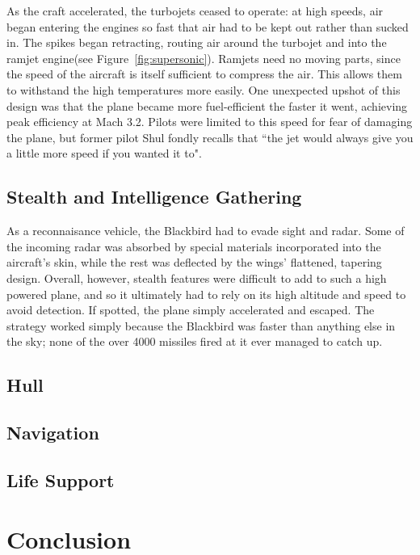 \documentclass[12pt, draftnocls, onecolumn]{IEEEtran}
\newcommand{\figref}[1]{Figure~\ref{fig:#1}}
\begin{document}
	As the craft accelerated, the turbojets ceased to operate: at high speeds, air began entering the engines so fast that air had to be kept out rather than sucked in. The spikes began retracting, routing air around the turbojet and into the ramjet engine(see \figref{supersonic}). Ramjets need no moving parts, since the speed of the aircraft is itself sufficient to compress the air. This allows them to withstand the high temperatures more easily. One unexpected upshot of this design was that the plane became more fuel-efficient the faster it went, achieving peak efficiency at Mach 3.2. Pilots were limited to this speed for fear of damaging the plane, but former pilot Shul fondly recalls that ``the jet would always give you a little more speed if you wanted it to"\cite{sleddriver}.
	

	\subsection{Stealth and Intelligence Gathering}
	
		As a reconnaisance vehicle, the Blackbird had to evade sight and radar. Some of the incoming radar was absorbed by special materials incorporated into the aircraft's skin, while the rest was deflected by the wings' flattened, tapering design. Overall, however, stealth features were difficult to add to such a high powered plane, and so it ultimately had to rely on its high altitude and speed to avoid detection. If spotted, the plane simply accelerated and escaped. The strategy worked simply because the Blackbird was faster than anything else in the sky; none of the over 4000\cite{sleddriver} missiles fired at it ever managed to catch up.
		
		
		
	\subsection{Hull}
	\subsection{Navigation}
	\subsection{Life Support}

\section{Conclusion}


{}

\end{document}

